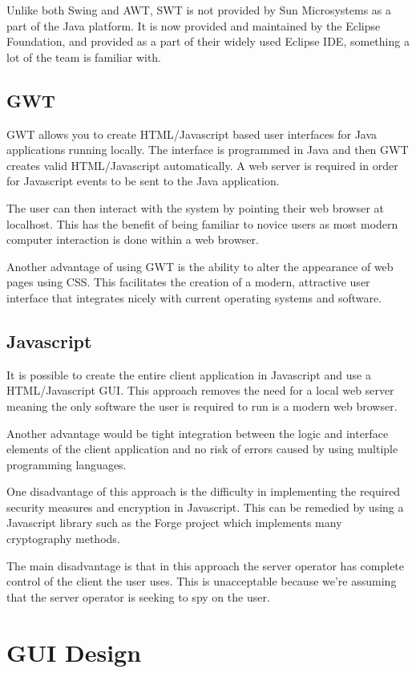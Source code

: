 Unlike both Swing and AWT, SWT is not provided by Sun Microsystems as a part of 
the Java platform. It is now provided and maintained by the Eclipse Foundation, 
and provided as a part of their widely used Eclipse IDE, something a lot of the 
team is familiar with.

\subsection{GWT}
GWT allows you to create HTML/Javascript based user interfaces for Java 
applications running locally. The interface is programmed in Java and then GWT 
creates valid HTML/Javascript automatically. A web server is required in order
for Javascript events to be sent to the Java application.

The user can then interact with the system by pointing their web browser at 
localhost. This has the benefit of being familiar to novice users as most modern 
computer interaction is done within a web browser. 

Another advantage of using GWT is the ability to alter the appearance of web 
pages using CSS. This facilitates the creation of a modern, attractive user 
interface that integrates nicely with current operating systems and software.

\subsection{Javascript}
It is possible to create the entire client application in Javascript and use a 
HTML/Javascript GUI. This approach removes the need for a local web server 
meaning the only software the user is required to run is a modern web browser.

Another advantage would be tight integration between the logic and interface 
elements of the client application and no risk of errors caused by using 
multiple programming languages.

One disadvantage of this approach is the difficulty in implementing the
required security measures and encryption in Javascript. This can be remedied by 
using a Javascript library such as the Forge project which implements many 
cryptography methods.

The main disadvantage is that in this approach the server operator has complete
control of the client the user uses. This is unacceptable because we're assuming
that the server operator is seeking to spy on the user.

\section{GUI Design}
